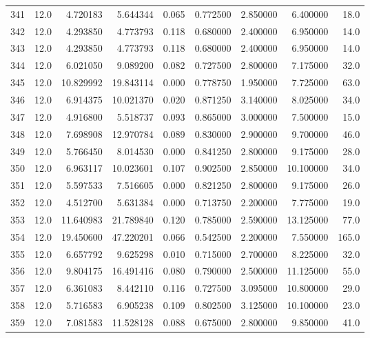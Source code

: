 \begin{tabular}{lrrrrrrrr}
341  &   12.0 &   4.720183 &   5.644344 &  0.065 &  0.772500 &  2.850000 &   6.400000 &   18.0 \\
342  &   12.0 &   4.293850 &   4.773793 &  0.118 &  0.680000 &  2.400000 &   6.950000 &   14.0 \\
343  &   12.0 &   4.293850 &   4.773793 &  0.118 &  0.680000 &  2.400000 &   6.950000 &   14.0 \\
344  &   12.0 &   6.021050 &   9.089200 &  0.082 &  0.727500 &  2.800000 &   7.175000 &   32.0 \\
345  &   12.0 &  10.829992 &  19.843114 &  0.000 &  0.778750 &  1.950000 &   7.725000 &   63.0 \\
346  &   12.0 &   6.914375 &  10.021370 &  0.020 &  0.871250 &  3.140000 &   8.025000 &   34.0 \\
347  &   12.0 &   4.916800 &   5.518737 &  0.093 &  0.865000 &  3.000000 &   7.500000 &   15.0 \\
348  &   12.0 &   7.698908 &  12.970784 &  0.089 &  0.830000 &  2.900000 &   9.700000 &   46.0 \\
349  &   12.0 &   5.766450 &   8.014530 &  0.000 &  0.841250 &  2.800000 &   9.175000 &   28.0 \\
350  &   12.0 &   6.963117 &  10.023601 &  0.107 &  0.902500 &  2.850000 &  10.100000 &   34.0 \\
351  &   12.0 &   5.597533 &   7.516605 &  0.000 &  0.821250 &  2.800000 &   9.175000 &   26.0 \\
352  &   12.0 &   4.512700 &   5.631384 &  0.000 &  0.713750 &  2.200000 &   7.775000 &   19.0 \\
353  &   12.0 &  11.640983 &  21.789840 &  0.120 &  0.785000 &  2.590000 &  13.125000 &   77.0 \\
354  &   12.0 &  19.450600 &  47.220201 &  0.066 &  0.542500 &  2.200000 &   7.550000 &  165.0 \\
355  &   12.0 &   6.657792 &   9.625298 &  0.010 &  0.715000 &  2.700000 &   8.225000 &   32.0 \\
356  &   12.0 &   9.804175 &  16.491416 &  0.080 &  0.790000 &  2.500000 &  11.125000 &   55.0 \\
357  &   12.0 &   6.361083 &   8.442110 &  0.116 &  0.727500 &  3.095000 &  10.800000 &   29.0 \\
358  &   12.0 &   5.716583 &   6.905238 &  0.109 &  0.802500 &  3.125000 &  10.100000 &   23.0 \\
359  &   12.0 &   7.081583 &  11.528128 &  0.088 &  0.675000 &  2.800000 &   9.850000 &   41.0 \\

\end{tabular}
